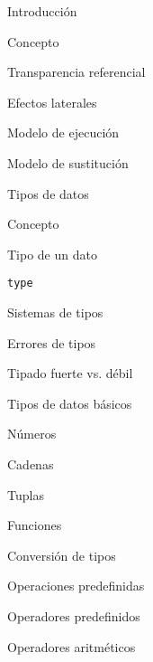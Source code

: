 \begin{longenum}
    \begin{longenum}
        \item Introducción
        \begin{longenum}
            \item Concepto
            \item Transparencia referencial
            \begin{longenum}
                \item Efectos laterales
            \end{longenum}
            \item Modelo de ejecución
            \begin{longenum}
                \item Modelo de sustitución
            \end{longenum}
        \end{longenum}
        \item Tipos de datos
        \begin{longenum}
            \item Concepto
            \item Tipo de un dato
            \item \texttt{type}
            \item Sistemas de tipos
            \begin{longenum}
                \item Errores de tipos
                \item Tipado fuerte vs. débil
            \end{longenum}
            \item Tipos de datos básicos
            \begin{longenum}
                \item Números
                \item Cadenas
                \item Tuplas
                \item Funciones
            \end{longenum}
            \item Conversión de tipos
        \end{longenum}
        \item Operaciones predefinidas
        \begin{longenum}
            \item Operadores predefinidos
            \begin{longenum}
                \item Operadores aritméticos

\end{longenum}
\end{longenum}
\end{longenum}
\end{longenum}
